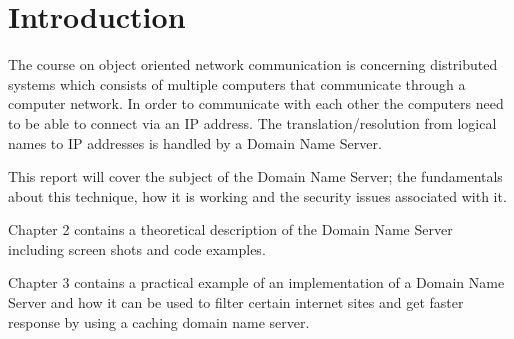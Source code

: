 \documentclass[Main]{subfiles}
\begin{document}
\chapter{Introduction}
The course on object oriented network communication is concerning distributed systems which consists of multiple computers that communicate through a computer network. In order to communicate with each other the computers need to be able to connect via an IP address. The translation/resolution from logical names to IP addresses is handled by a Domain Name Server.\vspace{10pt}

This report will cover the subject of the Domain Name Server; the fundamentals about this technique, how it is working and the security issues associated with it.\vspace{10pt}

Chapter 2 contains a theoretical description of the Domain Name Server including screen shots and code examples.\vspace{10pt}

Chapter 3 contains a practical example of an implementation of a Domain Name Server and how it can be used to filter certain internet sites and get faster response by using a caching domain name server.
\end{document}
